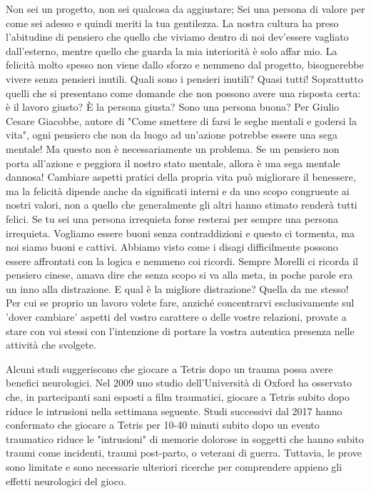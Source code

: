 \documentclass[12pt]{book} %
\begin{document}
Non sei un progetto, non sei qualcosa da aggiustare; Sei una
persona di valore per come sei adesso e quindi meriti la tua gentilezza. La nostra cultura ha preso l'abitudine di
pensiero che quello che viviamo dentro di noi dev'essere vagliato dall'esterno, mentre quello che
guarda la mia interiorità è solo affar mio. La felicità molto spesso non viene dallo sforzo e nemmeno dal
progetto, bisognerebbe vivere senza pensieri inutili. Quali sono i pensieri inutili? Quasi tutti! Soprattutto quelli
che si presentano come domande che  non possono avere una risposta certa: è il lavoro giusto? È la persona giusta? Sono una persona
buona? 
Per Giulio Cesare Giacobbe, autore di "Come smettere di farsi le seghe mentali e godersi la vita", ogni pensiero che non da luogo ad un'azione potrebbe essere una sega mentale! Ma questo non è necessariamente un problema. Se un pensiero non porta all'azione e peggiora il nostro stato mentale, allora è una sega mentale dannosa!
Cambiare aspetti pratici della propria vita può migliorare il benessere, ma la felicità dipende anche da significati interni e da uno scopo congruente ai nostri valori, non a quello che generalmente gli altri hanno stimato renderà tutti felici. Se tu sei una persona irrequieta forse resterai per sempre una persona irrequieta. Vogliamo
essere buoni senza contraddizioni e questo ci tormenta, ma noi siamo buoni e cattivi. Abbiamo visto come i disagi difficilmente possono essere affrontati con la logica e nemmeno coi ricordi. 
Sempre Morelli ci ricorda il pensiero cinese, amava dire che senza scopo si va alla meta, in poche parole era un inno alla distrazione. E qual è la migliore distrazione? Quella da me stesso! Per cui se proprio un lavoro volete fare, anziché concentrarvi esclusivamente sul 'dover cambiare' aspetti del vostro carattere o delle vostre relazioni, provate a stare con voi stessi con l'intenzione di portare la vostra autentica presenza nelle attività che svolgete. 

\begin{mdframed}[linewidth=1pt]
Alcuni studi suggeriscono che giocare a Tetris dopo un trauma possa avere benefici neurologici. Nel 2009 uno studio dell’Università di Oxford ha osservato che, in partecipanti sani esposti a film traumatici, giocare a Tetris subito dopo riduce le intrusioni nella settimana seguente. Studi successivi dal 2017 hanno confermato che giocare a Tetris per 10-40 minuti subito dopo un evento traumatico riduce le "intrusioni" di memorie dolorose in soggetti che hanno subito traumi come incidenti, traumi post-parto, o veterani di guerra. Tuttavia, le prove sono limitate e sono necessarie ulteriori ricerche per comprendere appieno gli effetti neurologici del gioco.
\end{mdframed}
\end{document}
